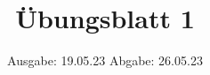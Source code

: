 

\title{Übungsblatt 1}
\date{%
  Ausgabe: 19.05.23 %
  \hspace{3em}
  Abgabe: 26.05.23 %
}



\maketitle
\thispagestyle{empty}
\tableofcontents
\newpage







